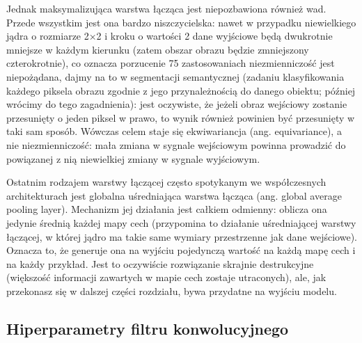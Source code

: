 \documentclass[12pt]{mwbk}
\theoremstyle{plain}
\theoremstyle{definition}
\theoremstyle{remark}
\begin{document}
Jednak maksymalizująca warstwa łącząca jest niepozbawiona również wad. Przede wszystkim jest
ona bardzo niszczycielska: nawet w przypadku niewielkiego jądra o rozmiarze 2×2 i kroku o wartości 2
dane wyjściowe będą dwukrotnie mniejsze w każdym kierunku (zatem obszar obrazu będzie
zmniejszony czterokrotnie), co oznacza porzucenie 75%
zastosowaniach niezmienniczość jest niepożądana, dajmy na to w segmentacji semantycznej (zadaniu
klasyfikowania każdego piksela obrazu zgodnie z jego przynależnością do danego obiektu; później
wrócimy do tego zagadnienia): jest oczywiste, że jeżeli obraz wejściowy zostanie przesunięty o jeden
piksel w prawo, to wynik również powinien być przesunięty w taki sam sposób. Wówczas celem staje
się ekwiwariancja (ang. equivariance), a nie niezmienniczość: mała zmiana w sygnale wejściowym
powinna prowadzić do powiązanej z nią niewielkiej zmiany w sygnale wyjściowym.


Ostatnim rodzajem warstwy łączącej często spotykanym we współczesnych architekturach jest
globalna uśredniająca warstwa łącząca (ang. global average pooling layer). Mechanizm jej działania
jest całkiem odmienny: oblicza ona jedynie średnią każdej mapy cech (przypomina to działanie
uśredniającej warstwy łączącej, w której jądro ma takie same wymiary przestrzenne jak dane
wejściowe). Oznacza to, że generuje ona na wyjściu pojedynczą wartość na każdą mapę cech
i na każdy przykład. Jest to oczywiście rozwiązanie skrajnie destrukcyjne (większość informacji
zawartych w mapie cech zostaje utraconych), ale, jak przekonasz się w dalszej części rozdziału,
bywa przydatne na wyjściu modelu.

\subsection{Hiperparametry filtru konwolucyjnego}

\cite{illustrated}
\end{document}
